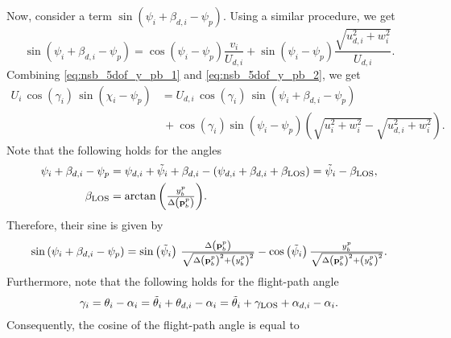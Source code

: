 \noindent Now, consider a term $\sin\left(\psi_i + \beta_{d,i} - \psi_p\right)$.
Using a similar procedure, we get
\begin{equation}
    \sin\left(\psi_i + \beta_{d,i} - \psi_p\right) = \cos\left(\psi_i - \psi_p\right)\frac{v_i}{U_{d,i}} + \sin\left(\psi_i - \psi_p\right)\frac{\sqrt{u_{d,i}^2 + w_i^2}}{U_{d,i}}. \label{eq:nsb_5dof_y_pb_2}
\end{equation}
Combining \eqref{eq:nsb_5dof_y_pb_1} and \eqref{eq:nsb_5dof_y_pb_2}, we get
\begin{equation}
    \begin{split}
    U_i\,\cos\left(\gamma_i\right)\,\sin\left(\chi_i - \psi_p\right) &= U_{d,i}\,\cos\left(\gamma_i\right)\,\sin\left(\psi_i + \beta_{d,i} - \psi_p\right) \\
    &\, +\! \cos\left(\gamma_i\right)\sin\left(\psi_{i\!} - \psi_p\right) \! \left(\!\sqrt{u_i^2\! + \!w_i^2} -\! \sqrt{u_{d,i}^2\! + w_i^2}\right). 
    \end{split}
    \label{eq:nsb_5dof_y_pb_3}
\end{equation}
Note that the following holds for the angles
\begin{equation}
    \begin{split}
        \psi_i + \beta_{d,i} - \psi_p &= \psi_{d,i} + \tilde{\psi}_i + \beta_{d,i} - \left(\psi_{d,i} + \beta_{d,i} + \beta_{\rm LOS}\right) = \tilde{\psi}_i - \beta_{\rm LOS}, \\
        \beta_{\rm LOS} &= \scale[1]{\arctan\left(\frac{y_b^p}{\Delta\left(\mat{p}_b^p\right)}\right)}.
    \end{split}
\end{equation}
Therefore, their sine is given by
\begin{equation}
    \sin\left(\psi_i + \beta_{d,i} - \psi_p\right) = \sin\left(\tilde{\psi}_i\right)\,\scale[1]{\frac{\Delta\left(\mat{p}_b^p\right)}{\sqrt{\Delta\left(\mat{p}_b^p\right)^2 + \left(y_b^p\right)^2}}} - \cos\left(\tilde{\psi}_i\right)\scale[1]{\frac{y_b^p}{\sqrt{\Delta\left(\mat{p}_b^p\right)^2 + \left(y_b^p\right)^2}}}.
    \label{eq:nsb_5dof_sin_psi_beta}
\end{equation}
Furthermore, note that the following holds for the flight-path angle
\begin{equation}
    \gamma_i = \theta_i - \alpha_i = \tilde{\theta}_i + \theta_{d,i} - \alpha_i = \tilde{\theta}_i + \gamma_{\rm LOS} + \alpha_{d,i} - \alpha_i.
\end{equation}
Consequently, the cosine of the flight-path angle is equal to
